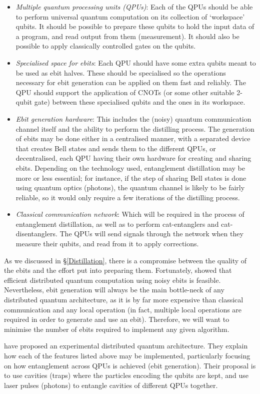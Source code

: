 \begin{itemize}
  \item \textit{Multiple quantum processing units (QPUs)}: Each of the QPUs should be able to perform universal quantum computation on its collection of `workspace' qubits. It should be possible to prepare these qubits to hold the input data of a program, and read output from them (measurement). It should also be possible to apply classically controlled gates on the qubits.

  \item \textit{Specialised space for ebits}: Each QPU should have some extra qubits meant to be used as ebit halves. These should be specialised so the operations necessary for ebit generation can be applied on them fast and reliably. The QPU should support the application of CNOTs (or some other suitable 2-qubit gate) between these specialised qubits and the ones in its workspace.
  
  \item \textit{Ebit generation hardware}: This includes the (noisy) quantum communication channel itself and the ability to perform the distilling process. The generation of ebits may be done either in a centralised manner, with a separated device that creates Bell states and sends them to the different QPUs, or decentralised, each QPU having their own hardware for creating and sharing ebits. Depending on the technology used, entanglement distillation may be more or less essential; for instance, if the step of sharing Bell states is done using quantum optics (photons), the quantum channel is likely to be fairly reliable, so it would only require a few iterations of the distilling process.
  
  \item \textit{Classical communication network}: Which will be required in the process of entanglement distillation, as well as to perform cat-entanglers and cat-disentanglers. The QPUs will send signals through the network when they measure their qubits, and read from it to apply corrections. 
\end{itemize}

As we discussed in \S\ref{Distillation}, there is a compromise between the quality of the ebits and the effort put into preparing them. Fortunately, \citet{NoisyChannels} showed that efficient distributed quantum computation using noisy ebits is feasible. Nevertheless, ebit generation will always be the main bottle-neck of any distributed quantum architecture, as it is by far more expensive than classical communication and any local operation (in fact, multiple local operations are required in order to generate and use an ebit). Therefore, we will want to minimise the number of ebits required to implement any given algorithm.

\citet{DistributedQCHW} have proposed an experimental distributed quantum architecture. They explain how each of the features listed above may be implemented, particularly focusing on how entanglement across QPUs is achieved (ebit generation). Their proposal is to use cavities (traps) where the particles encoding the qubits are kept, and use laser pulses (photons) to entangle cavities of different QPUs together.